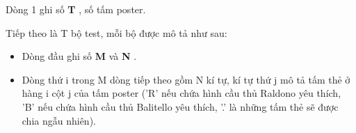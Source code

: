 Dòng 1 ghi số \textbf{ T } , số tấm poster.

Tiếp theo là T bộ test, mỗi bộ được mô tả như sau:
\begin{itemize}
	\item Dòng đầu ghi số \textbf{ M } và \textbf{ N } .
\end{itemize}
\begin{itemize}
	\item Dòng thứ i trong M dòng tiếp theo gồm N kí tự, kí tự thứ j mô tả tấm thẻ ở hàng i cột j của tấm poster ('R' nếu chứa hình cầu thủ Raldono yêu thích, 'B' nếu chứa hình cầu thủ Balitello yêu thích, '.' là những tấm thẻ sẽ được chia ngẫu nhiên).
\end{itemize}